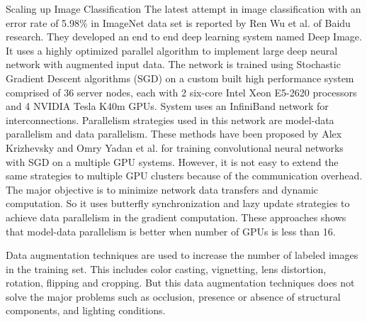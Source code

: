 \documentclass{llncs}
\begin{document}
\begin{subsection}{Scaling up Image Classification}
The latest attempt in image classification with an error rate of 5.98\% in ImageNet data set is reported by Ren Wu et al. \cite{Wu2015} of Baidu research. They developed an end to end deep learning  system named Deep Image. It uses a highly optimized parallel algorithm to implement large deep neural network with augmented input data. The network is trained using Stochastic Gradient Descent algorithms (SGD) on a custom built high performance system comprised of 36 server nodes, each with 2 six-core Intel Xeon E5-2620 processors and 4 NVIDIA Tesla K40m GPUs. System  uses an InfiniBand  network for interconnections. Parallelism strategies used in this network are model-data parallelism and data parallelism. These methods have been proposed by Alex Krizhevsky \cite{Krizhevsky2014} and Omry Yadan et al. \cite{Yadan2013} for training convolutional neural networks with SGD on a  multiple GPU systems. However, it is not easy to extend the same strategies to multiple GPU clusters because of the communication overhead. The major objective is to minimize network data transfers and dynamic computation. So it uses butterfly synchronization and lazy update strategies to achieve data parallelism in the gradient computation. These approaches shows that model-data parallelism is better when number of GPUs is less than 16. %
\par
Data augmentation techniques are used to increase the number of labeled images in the training set. This includes color casting, vignetting, lens distortion, rotation, flipping and cropping. But this data augmentation techniques  does not solve the major problems such as occlusion, presence or absence of structural components, and lighting conditions.
\centering
\begin{table*}[ht]
\captionsetup{justification=centering,belowskip=1pt,aboveskip=1pt}
\caption[]{ Comparative analysis of state-of-the-art deep convolutional network based image classification algorithms using ILSVRC dataset.}
 \begin{tabular}{ | p{2.7cm} | l | p{1.4cm} |p{1.1cm} |p{.8cm} |p{1.3cm} |p{1.1cm} |p{5cm}|}


\end{tabular}
\end{table*}
\end{subsection}
\end{document}
